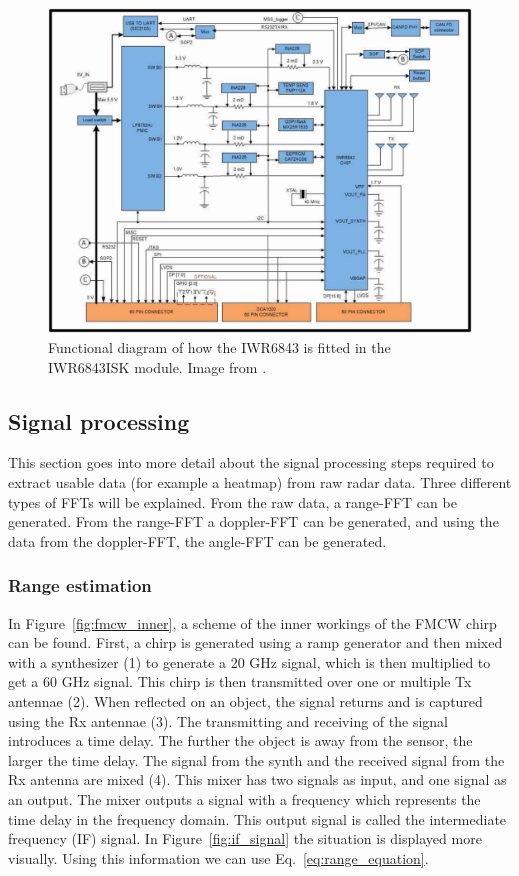 \begin{figure}[t]
\centering
\includegraphics[width=.95\textwidth]{figures/background/iwr6843isk_connection.png}
\caption{Functional diagram of how the IWR6843 is fitted in the IWR6843ISK module. Image from \cite{iwr6843isk_website}.}
\label{fig:iwr6843_connection}
\end{figure}

\subsection{Signal processing}
This section goes into more detail about the signal processing steps required to extract usable data (for example a heatmap) from raw radar data. Three different types of FFTs will be explained. From the raw data, a range-FFT can be generated. From the range-FFT a doppler-FFT can be generated, and using the data from the doppler-FFT, the angle-FFT can be generated.

\subsubsection{Range estimation}
\label{sec:range_estimation_background}
In Figure~\ref{fig:fmcw_inner}, a scheme of the inner workings of the FMCW chirp can be found. First, a chirp is generated using a ramp generator and then mixed with a synthesizer (1) to generate a 20 GHz signal, which is then multiplied to get a 60 GHz signal. This chirp is then transmitted over one or multiple Tx antennae (2). When reflected on an object, the signal returns and is captured using the Rx antennae (3). The transmitting and receiving of the signal introduces a time delay. The further the object is away from the sensor, the larger the time delay. The signal from the synth and the received signal from the Rx antenna are mixed (4). This mixer has two signals as input, and one signal as an output. The mixer outputs a signal with a frequency which represents the time delay in the frequency domain. This output signal is called the intermediate frequency (IF) signal. In Figure~\ref{fig:if_signal} the situation is displayed more visually. Using this information we can use Eq.~\ref{eq:range_equation}.

